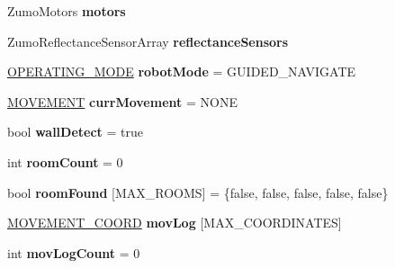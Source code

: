 \begin{DoxyCompactItemize}
\item 
\hypertarget{robotcode_8ino_a107e8fa5802407f91589286783cb7c5d}{Zumo\+Motors {\bfseries motors}}\label{robotcode_8ino_a107e8fa5802407f91589286783cb7c5d}

\item 
\hypertarget{robotcode_8ino_a843402006805fb58c2fd952b79d491d8}{Zumo\+Reflectance\+Sensor\+Array {\bfseries reflectance\+Sensors}}\label{robotcode_8ino_a843402006805fb58c2fd952b79d491d8}

\item 
\hypertarget{robotcode_8ino_af589ed314ba3266f151b5c974f6868ea}{\hyperlink{robotcode_8ino_a980e950615d86dadef54f3cfaefb5fb4}{O\+P\+E\+R\+A\+T\+I\+N\+G\+\_\+\+M\+O\+D\+E} {\bfseries robot\+Mode} = G\+U\+I\+D\+E\+D\+\_\+\+N\+A\+V\+I\+G\+A\+T\+E}\label{robotcode_8ino_af589ed314ba3266f151b5c974f6868ea}

\item 
\hypertarget{robotcode_8ino_a834bdca1649fc7a14bcd0ef9c5d8b2ec}{\hyperlink{robotcode_8ino_adc716dd21485bffb9015eaeb3cfe6859}{M\+O\+V\+E\+M\+E\+N\+T} {\bfseries curr\+Movement} = N\+O\+N\+E}\label{robotcode_8ino_a834bdca1649fc7a14bcd0ef9c5d8b2ec}

\item 
\hypertarget{robotcode_8ino_a36454f4d674274472f062b8b609143a1}{bool {\bfseries wall\+Detect} = true}\label{robotcode_8ino_a36454f4d674274472f062b8b609143a1}

\item 
\hypertarget{robotcode_8ino_a90c3ccdd5d149c3fa002c1bb5bde0a20}{int {\bfseries room\+Count} = 0}\label{robotcode_8ino_a90c3ccdd5d149c3fa002c1bb5bde0a20}

\item 
\hypertarget{robotcode_8ino_a35b2ab6efdd73d9f5b5f60ea52b2fce2}{bool {\bfseries room\+Found} \mbox{[}M\+A\+X\+\_\+\+R\+O\+O\+M\+S\mbox{]} = \{false, false, false, false, false\}}\label{robotcode_8ino_a35b2ab6efdd73d9f5b5f60ea52b2fce2}

\item 
\hypertarget{robotcode_8ino_aa17773ebf8f2431cdae430c3aeb79fff}{\hyperlink{structMOVEMENT__COORD}{M\+O\+V\+E\+M\+E\+N\+T\+\_\+\+C\+O\+O\+R\+D} {\bfseries mov\+Log} \mbox{[}M\+A\+X\+\_\+\+C\+O\+O\+R\+D\+I\+N\+A\+T\+E\+S\mbox{]}}\label{robotcode_8ino_aa17773ebf8f2431cdae430c3aeb79fff}

\item 
\hypertarget{robotcode_8ino_a64310643aac4e3bb3b3a0c6117b3313b}{int {\bfseries mov\+Log\+Count} = 0}\label{robotcode_8ino_a64310643aac4e3bb3b3a0c6117b3313b}

\end{DoxyCompactItemize}


